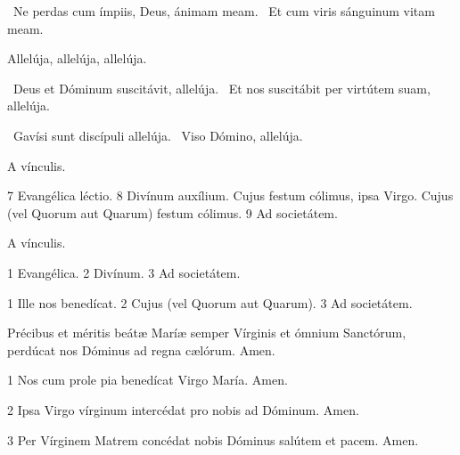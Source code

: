 \V\ Ne perdas cum ímpiis, Deus, ánimam meam. \R\ Et cum viris sánguinum vitam meam.


 Allelúja, allelúja, allelúja.


\V\ Deus et Dóminum suscitávit, allelúja. \R\ Et nos suscitábit per virtútem suam, allelúja.


\V\ Gavísi sunt discípuli allelúja. \R\ Viso Dómino, allelúja.


 A vínculis.

 7 Evangélica léctio. 8  Divínum auxílium.  Cujus festum cólimus, ipsa Virgo.  Cujus (vel Quorum aut Quarum) festum cólimus. 9 Ad societátem. 


 A vínculis.


 1 Evangélica. 2 Divínum. 3 Ad societátem.


 1 Ille nos benedícat. 2 Cujus (vel Quorum aut Quarum). 3 Ad societátem.


 Précibus et méritis beátæ Maríæ semper Vírginis et ómnium Sanctórum, perdúcat nos Dóminus ad regna cælórum. Amen.

 1 Nos cum prole pia benedícat Virgo María. Amen.

2 Ipsa Virgo vírginum intercédat pro nobis ad Dóminum. Amen.

3 Per Vírginem Matrem concédat nobis Dóminus salútem et pacem. Amen.

\sectionornament


